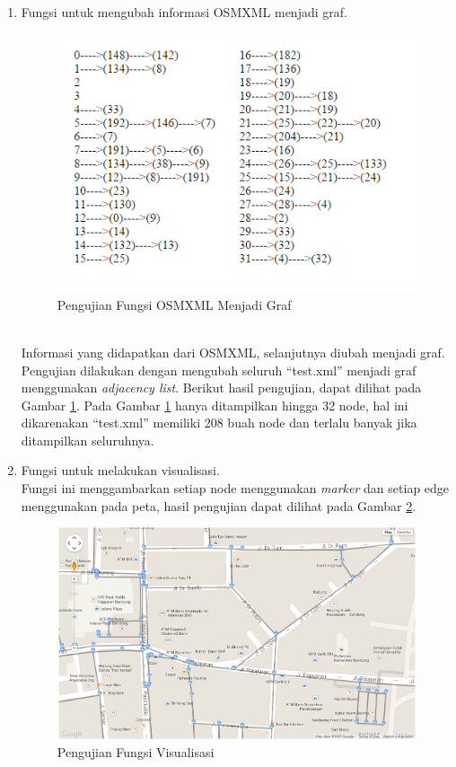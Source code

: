 \begin{enumerate}
\item Fungsi untuk mengubah informasi OSMXML menjadi graf.
\begin{figure}[h]
\centering
\includegraphics[scale=1]{Gambar/pu_graf}
\caption[Pengujian Fungsi OSMXML Menjadi Graf]{Pengujian Fungsi OSMXML Menjadi Graf}
\label{fig:pu_graf}
\end{figure}\\
  Informasi yang didapatkan dari OSMXML, selanjutnya diubah menjadi graf.
  Pengujian dilakukan dengan mengubah seluruh ``test.xml'' menjadi graf
  menggunakan \textit{adjacency list}. Berikut hasil pengujian, dapat dilihat
  pada Gambar \ref{fig:pu_graf}. Pada Gambar \ref{fig:pu_graf} hanya ditampilkan
  hingga 32 node, hal ini dikarenakan ``test.xml'' memiliki 208 buah node dan 
  terlalu banyak jika ditampilkan seluruhnya.
  
  \item Fungsi untuk melakukan visualisasi.\\
  Fungsi ini menggambarkan setiap node menggunakan \textit{marker} dan
  setiap edge menggunakan  pada peta, hasil pengujian dapat
  dilihat pada Gambar \ref{fig:pu_visual}.
\begin{figure}[h]
\centering
\includegraphics[scale=0.5]{Gambar/pu_visual}
\caption[Pengujian Fungsi Visualisasi]{Pengujian Fungsi Visualisasi}
\label{fig:pu_visual}
\end{figure}


\end{enumerate}
